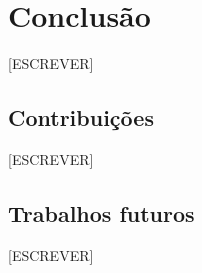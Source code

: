 \section{Conclusão}

%
%
%

[ESCREVER]

\subsection{Contribuições}

%
%
[ESCREVER]

\subsection{Trabalhos futuros}

[ESCREVER]
